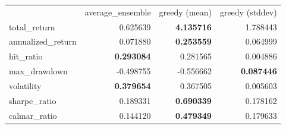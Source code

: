 \begin{tabular}{lrrr}
 & average_ensemble & greedy (mean) & greedy (stddev) \\
total_return & 0.625639 & \bfseries 4.135716 & 1.788443 \\
annualized_return & 0.071880 & \bfseries 0.253559 & 0.064999 \\
hit_ratio & \bfseries 0.293084 & 0.281565 & 0.004886 \\
max_drawdown & -0.498755 & -0.556662 & \bfseries 0.087446 \\
volatility & \bfseries 0.379654 & 0.367505 & 0.005603 \\
sharpe_ratio & 0.189331 & \bfseries 0.690339 & 0.178162 \\
calmar_ratio & 0.144120 & \bfseries 0.479349 & 0.179633 \\
\end{tabular}
